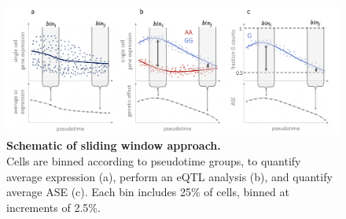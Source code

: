 \begin{figure}[h]
\centering
\includegraphics[width=15.5cm]{Chapter4/Fig/endodiff_running_average.png}
\caption[Schematic of sliding window approach]{\textbf{Schematic of sliding window approach.}\\
Cells are binned according to pseudotime groups, to quantify average expression (a), perform an eQTL analysis (b), and quantify average ASE (c).
Each bin includes 25\% of cells, binned at increments of 2.5\%.}
\label{fig:endodiff_sliding_window}
\end{figure}

